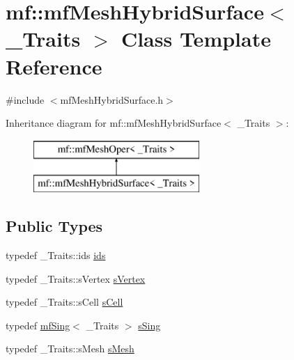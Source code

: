 \hypertarget{classmf_1_1mfMeshHybridSurface}{
\section{mf::mfMeshHybridSurface$<$ \_\-Traits $>$ Class Template Reference}
\label{classmf_1_1mfMeshHybridSurface}
}


{\ttfamily \#include $<$mfMeshHybridSurface.h$>$}

Inheritance diagram for mf::mfMeshHybridSurface$<$ \_\-Traits $>$:\begin{figure}[H]
\begin{center}
\leavevmode
\includegraphics[height=2.000000cm]{classmf_1_1mfMeshHybridSurface}
\end{center}
\end{figure}
\subsection*{Public Types}
\begin{DoxyCompactItemize}
\item 
typedef \_\-Traits::ids \hyperlink{classmf_1_1mfMeshHybridSurface_a46dd7994ecadd8ead204ab52dcb632ca}{ids}
\item 
typedef \_\-Traits::sVertex \hyperlink{classmf_1_1mfMeshHybridSurface_a3739f5c613f7c0fce7946c0f4fdeeb1b}{sVertex}
\item 
typedef \_\-Traits::sCell \hyperlink{classmf_1_1mfMeshHybridSurface_ae8effc64c1dfb9b88223478812400505}{sCell}
\item 
typedef \hyperlink{classmf_1_1mfSing}{mfSing}$<$ \_\-Traits $>$ \hyperlink{classmf_1_1mfMeshHybridSurface_ac9e0a04d9e5f9cf40d751f7661ac9a7a}{sSing}
\item 
typedef \_\-Traits::sMesh \hyperlink{classmf_1_1mfMeshHybridSurface_a204a2dcbd0802b263253055d7d2d1b9a}{sMesh}
\end{DoxyCompactItemize}
